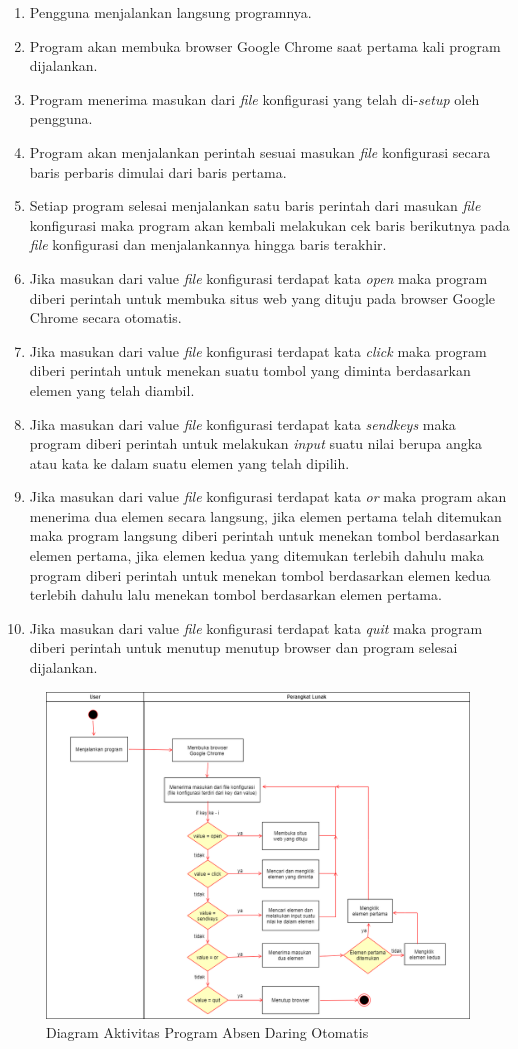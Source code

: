 \begin{enumerate}
	\item Pengguna menjalankan langsung programnya.
	\item Program akan membuka browser Google Chrome saat pertama kali program dijalankan.
	\item Program menerima masukan dari \textit{file} konfigurasi yang telah di-\textit{setup} oleh pengguna.
	\item Program akan menjalankan perintah sesuai masukan \textit{file} konfigurasi secara baris perbaris dimulai dari baris pertama.
	\item Setiap program selesai menjalankan satu baris perintah dari masukan \textit{file} konfigurasi maka program akan kembali melakukan cek baris berikutnya pada \textit{file} konfigurasi dan menjalankannya hingga baris terakhir.
	\item Jika masukan dari value \textit{file} konfigurasi terdapat kata \textit{open} maka program diberi perintah untuk membuka situs web yang dituju pada browser Google Chrome secara otomatis.
	\item Jika masukan dari value \textit{file} konfigurasi terdapat kata \textit{click} maka program diberi perintah untuk menekan suatu tombol yang diminta berdasarkan elemen yang telah diambil.
	\item Jika masukan dari value \textit{file} konfigurasi terdapat kata \textit{sendkeys} maka program diberi perintah untuk melakukan \textit{input} suatu nilai berupa angka atau kata ke dalam suatu elemen yang telah dipilih.
	\item Jika masukan dari value \textit{file} konfigurasi terdapat kata \textit{or} maka program akan menerima dua elemen secara langsung, jika elemen pertama telah ditemukan maka program langsung diberi perintah untuk menekan tombol berdasarkan elemen pertama, jika elemen kedua yang ditemukan terlebih dahulu maka program diberi perintah untuk menekan tombol berdasarkan elemen kedua terlebih dahulu lalu menekan tombol berdasarkan elemen pertama.
	\item Jika masukan dari value \textit{file} konfigurasi terdapat kata \textit{quit} maka program diberi perintah untuk menutup menutup browser dan program selesai dijalankan.

\end{enumerate}
\begin{figure}[H]
	\centering
	\includegraphics[scale=0.4]{Gambar/ActivityAplikasi.png}
	\caption{Diagram Aktivitas Program Absen Daring Otomatis} 
	\label{fig:ActivityAplikasi}
\end{figure}

